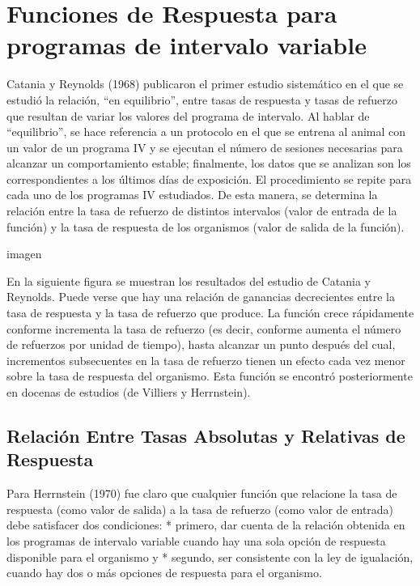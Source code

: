 \documentclass[
  letterpaper,
]{book}
\begin{document}
\section{Funciones de Respuesta para programas de intervalo
variable}\label{funciones-de-respuesta-para-programas-de-intervalo-variable}

Catania y Reynolds (1968) publicaron el primer estudio sistemático en el
que se estudió la relación, ``en equilibrio'', entre tasas de respuesta
y tasas de refuerzo que resultan de variar los valores del programa de
intervalo. Al hablar de ``equilibrio'', se hace referencia a un
protocolo en el que se entrena al animal con un valor de un programa IV
y se ejecutan el número de sesiones necesarias para alcanzar un
comportamiento estable; finalmente, los datos que se analizan son los
correspondientes a los últimos días de exposición. El procedimiento se
repite para cada uno de los programas IV estudiados. De esta manera, se
determina la relación entre la tasa de refuerzo de distintos intervalos
(valor de entrada de la función) y la tasa de respuesta de los
organismos (valor de salida de la función).

imagen

En la siguiente figura se muestran los resultados del estudio de Catania
y Reynolds. Puede verse que hay una relación de ganancias decrecientes
entre la tasa de respuesta y la tasa de refuerzo que produce. La función
crece rápidamente conforme incrementa la tasa de refuerzo (es decir,
conforme aumenta el número de refuerzos por unidad de tiempo), hasta
alcanzar un punto después del cual, incrementos subsecuentes en la tasa
de refuerzo tienen un efecto cada vez menor sobre la tasa de respuesta
del organismo. Esta función se encontró posteriormente en docenas de
estudios (de Villiers y Herrnstein).

\subsection{Relación Entre Tasas Absolutas y Relativas de
Respuesta}\label{relaciuxf3n-entre-tasas-absolutas-y-relativas-de-respuesta}

Para Herrnstein (1970) fue claro que cualquier función que relacione la
tasa de respuesta (como valor de salida) a la tasa de refuerzo (como
valor de entrada) debe satisfacer dos condiciones: * primero, dar cuenta
de la relación obtenida en los programas de intervalo variable cuando
hay una sola opción de respuesta disponible para el organismo y *
segundo, ser consistente con la ley de igualación, cuando hay dos o más
opciones de respuesta para el organismo.
\end{document}
